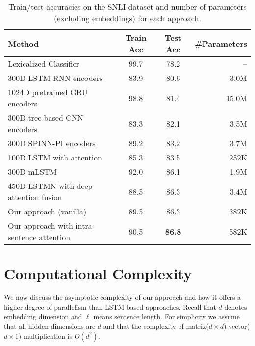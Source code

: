 \documentclass[11pt,letterpaper]{article}
\begin{document}
\begin{table*}[!tbp]
\begin{center}
\begin{tabular}{lccr}
\toprule
Method & Train Acc & Test Acc & \#Parameters \\
\midrule
Lexicalized Classifier \cite{bowman2015large} & 99.7 & 78.2 & --  \\
\midrule
300D LSTM RNN encoders \cite{bowman2016fast} & 83.9 & 80.6 & 3.0M \\
1024D pretrained GRU encoders \cite{vendrov2015order} & 98.8 & 81.4 & 15.0M \\
300D tree-based CNN encoders \cite{mou2015recognizing} & 83.3 & 82.1 & 3.5M \\
300D SPINN-PI encoders \cite{bowman2016fast} & 89.2 & 83.2 &  3.7M \\
\midrule
100D LSTM with attention \cite{rocktaschel2015reasoning} & 85.3 & 83.5 & 252K \\
300D mLSTM \cite{wang2015learning} & 92.0 & 86.1 & 1.9M \\
450D LSTMN with deep attention fusion \cite{cheng2016long} & 88.5 & 86.3 & 3.4M \\
\midrule
Our approach (vanilla)  & 89.5 & 86.3 & 382K \\
Our approach with intra-sentence attention & 90.5 & \textbf{86.8} & 582K \\
\bottomrule
\end{tabular}
\end{center}
\caption{Train/test accuracies on the SNLI dataset and number of parameters (excluding embeddings) for each approach.}
\label{table:snli-results}
\vspace{-0.4cm}
\end{table*}

\vspace{-0.1cm}
\section{Computational Complexity}
\label{sec:complexity}
\vspace{-0.1cm}

We now discuss the asymptotic complexity of our approach and how it offers a higher degree of parallelism than LSTM-based approaches.
Recall that $d$ denotes embedding dimension and $\ell$ means sentence length. For simplicity we assume that all hidden dimensions are $d$ and that the complexity of matrix($d\times d$)-vector($d \times 1$) multiplication is $O(d^2)$.
\end{document}
